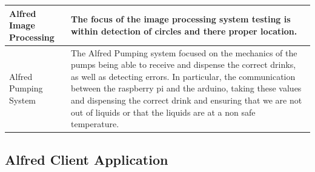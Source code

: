 \documentclass [10pt]{article}
\begin{document}
\begin{longtable}{| p{} | p{} |}
	 	Alfred Image Processing & The focus of the image processing system testing is within detection of circles and there proper location.  \\ \hline	
	 	Alfred Pumping System & The Alfred Pumping system focused on the mechanics of the pumps being able to receive and dispense the correct drinks, as well as detecting errors. In particular, the communication between the raspberry pi and the arduino, taking these values and dispensing the correct drink and ensuring that we are not out of liquids or that the liquids are at a non safe temperature. \\ \hline	
	\end{longtable}
\subsection{Alfred Client Application}
\end{document}
